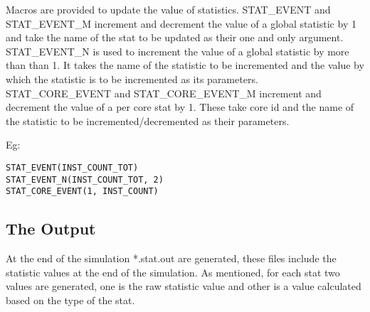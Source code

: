 \smallskip

Macros are provided to update the value of statistics. STAT\_EVENT and
STAT\_EVENT\_M increment and decrement the value of a global statistic by 1 and
take the name of the stat to be updated as their one and only argument.
STAT\_EVENT\_N is used to increment the value of a global statistic by more
than than 1. It takes the name of the statistic to be incremented and the value
by which the statistic is to be incremented as its parameters.
STAT\_CORE\_EVENT and STAT\_CORE\_EVENT\_M increment and decrement the value of
a per core stat by 1. These take core id and the name of the statistic to be
incremented/decremented as their parameters.

Eg:
\begin{lstlisting}
STAT_EVENT(INST_COUNT_TOT)
STAT_EVENT_N(INST_COUNT_TOT, 2)
STAT_CORE_EVENT(1, INST_COUNT)
\end{lstlisting}
\smallskip


\subsection{The Output}

At the end of the simulation *.stat.out are generated, these files include the
statistic values at the end of the simulation. As mentioned, for each stat two
values are generated, one is the raw statistic value and other is a value
calculated based on the type of the stat.


